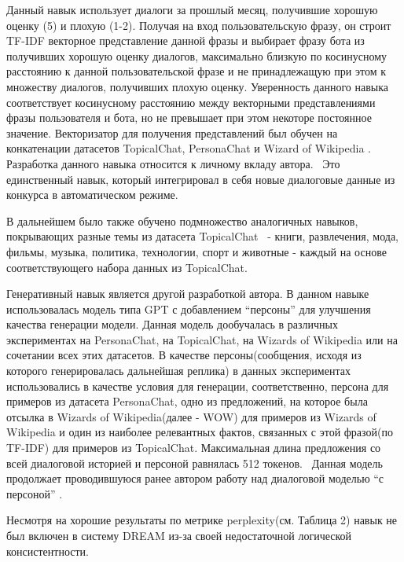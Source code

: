 Данный навык использует диалоги за прошлый месяц, получившие хорошую оценку (5) и плохую (1-2). Получая на вход пользовательскую фразу, он строит TF-IDF векторное представление данной фразы и выбирает фразу бота из получивших хорошую оценку диалогов, максимально близкую по косинусному расстоянию к данной пользовательской фразе и не принадлежащую при этом к множеству диалогов, получивших плохую оценку. Уверенность данного навыка соответствует косинусному расстоянию между векторными представлениями фразы пользователя и бота, но не превышает при этом некоторе постоянное значение. Векторизатор для получения представлений был обучен на конкатенации датасетов TopicalChat\cite{Karthik Gopalakrishnan_2019}, PersonaChat \cite{Zhang_Dinan_Urbanek_Szlam_Kiela_Weston_2018} и Wizard of Wikipedia \cite{Emily Dinan_2018}. Разработка данного навыка относится к личному вкладу автора.  Это единственный навык, который интегрировал в себя новые диалоговые данные из конкурса в автоматическом режиме.

В дальнейшем было также обучено подмножество аналогичных навыков, покрывающих разные темы из датасета TopicalChat  - книги, развлечения, мода, фильмы, музыка, политика, технологии, спорт и животные - каждый на основе соответствующего набора данных из TopicalChat. 


Генеративный навык является другой разработкой автора. В данном навыке использовалась модель типа GPT\cite{Radford_Narasimhan_Salimans_Sutskever_2018} с добавлением “персоны” для улучшения качества генерации модели. Данная модель дообучалась в различных экспериментах на PersonaChat, на TopicalChat, на Wizards of Wikipedia или на сочетании всех этих датасетов. В качестве персоны(сообщения, исходя из которого генерировалась дальнейшая реплика) в данных экспериментах использовались в качестве условия для генерации, соответственно, персона для примеров из датасета PersonaChat, одно из предложений, на которое была отсылка в Wizards of Wikipedia(далее - WOW) для примеров из Wizards of Wikipedia и один из наиболее релевантных фактов, связанных с этой фразой(по TF-IDF) для примеров из TopicalChat. Максимальная длина предложения со всей диалоговой историей и персоной равнялась 512 токенов.  Данная модель продолжает проводившуюся ранее автором работу над диалоговой моделью “с персоной” \cite{Болотин_Карпов_Рашков_Шкурак_2019}.

Несмотря на хорошие результаты по метрике perplexity(см. Таблица 2) навык не был включен в систему DREAM из-за своей недостаточной логической консистентности.


